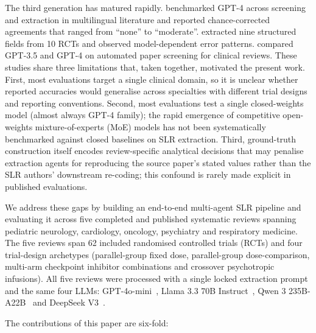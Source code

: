 \documentclass[a4paper,fleqn]{cas-sc}
\begin{document}
The third generation has matured rapidly. \citet{khraisha2024llmsr}
benchmarked GPT-4 across screening and extraction in multilingual
literature and reported chance-corrected agreements that ranged from
``none'' to ``moderate''. \citet{gartlehner2024aisr} extracted nine
structured fields from 10 RCTs and observed model-dependent error patterns.
\citet{guo2024llmsr} compared GPT-3.5 and GPT-4 on automated paper
screening for clinical reviews. These studies share three limitations
that, taken together, motivated the present work. First, most evaluations
target a single clinical domain, so it is unclear whether reported
accuracies would generalise across specialties with different trial
designs and reporting conventions. Second, most evaluations test a
single closed-weights model (almost always GPT-4 family); the rapid
emergence of competitive open-weights mixture-of-experts (MoE) models
\citep{grattafiori2024llama3,yang2025qwen3,deepseekv3,shazeer2017moe}
has not been systematically benchmarked against closed baselines on SLR
extraction. Third, ground-truth construction itself encodes
review-specific analytical decisions that may penalise
extraction agents for reproducing the source paper's stated values
rather than the SLR authors' downstream re-coding; this confound is rarely
made explicit in published evaluations.

We address these gaps by building an end-to-end multi-agent SLR pipeline
and evaluating it across five completed and published systematic reviews
spanning pediatric neurology, cardiology, oncology, psychiatry and
respiratory medicine. The five reviews span 62 included randomised
controlled trials (RCTs) and four trial-design archetypes (parallel-group
fixed dose, parallel-group dose-comparison, multi-arm checkpoint inhibitor
combinations and crossover psychotropic infusions). All five reviews were
processed with a single locked extraction prompt and the same four LLMs:
GPT-4o-mini~\citep{achiam2023gpt4}, Llama 3.3 70B
Instruct~\citep{grattafiori2024llama3}, Qwen 3 235B-A22B~\citep{yang2025qwen3}
and DeepSeek V3~\citep{deepseekv3}.

The contributions of this paper are six-fold:
\end{document}
